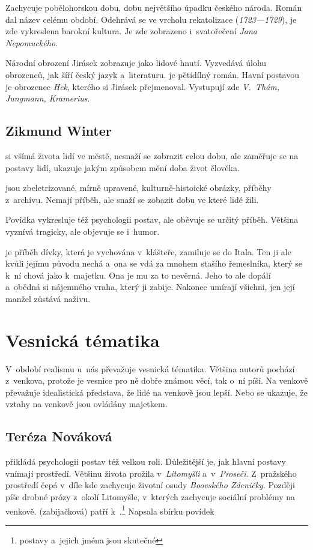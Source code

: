 Zachycuje pobělohorskou dobu, dobu největšího úpadku českého národa.
Román  dal název celému období. Odehrává se ve vrcholu
rekatolizace (\emph{1723---1729}), je zde vykreslena barokní kultura.
Je zde zobrazeno i~svatořečení \emph{Jana Nepomuckého}.

Národní obrození Jirásek zobrazuje jako lidové hnutí. Vyzvedává úlohu
obrozenců, jak šíří český jazyk a~literaturu.  je
pětidílný román. Havní postavou je obrozenec \emph{Hek}, kterého si Jirásek
přejmenoval. Vystupují zde \emph{V.~Thám, Jungmann, Kramerius}.

\subsection*{Zikmund Winter}
 si všímá života lidí ve městě, nesnaží se zobrazit celou
dobu, ale zaměřuje se na postavy lidí, ukazuje jakým způsobem mění doba
život člověka. 

 jsou zbeletrizované, mírně upravené,
kulturně-histoické obrázky, příběhy z~archívu. Nemají příběh,
ale snaží se zobazit dobu ve které lidé žili.

Povídka  vykresluje též psychologii postav,
ale oběvuje se určitý příběh. Většina vyznívá tragicky, ale
objevuje se i~humor.

 je příběh dívky, která je vychována v~klášteře,
zamiluje se do Itala. Ten ji ale kvůli jejímu původu nechá a~ona se vdá
za mnohem stašího řemeslníka, který se k~ní chová jako k~majetku. Ona je
mu za to nevěrná. Jeho to ale dopálí a~obědná si nájemného vraha, který
ji zabije. Nakonec umírají všichni, jen její manžel zůstává naživu.

\section{Vesnická tématika}
V~období realismu u~nás převažuje vesnická tématika. Většina autorů
pochází z~venkova, protože je vesnice pro ně dobře známou věcí, tak o~ní
píší. Na venkově převažuje idealistická představa, že lidé na venkově
jsou lepší. Nebo se ukazuje, že vztahy na venkově jsou ovládány majetkem.

\subsection*{Teréza Nováková}
 přikládá psychologii postav též velkou roli.
Důležitější je, jak hlavní postavy vnímají prostředí. Většinu života
prožila v~\emph{Litomyšli} a~v~\emph{Proseči}. Z~pražského prostředí
čepá v~díle  kde zachycuje životní osudy
\emph{Boovského Zdeničky}. Později píše drobné prózy z~okolí Litomyšle,
v~kterých zachycuje sociální problémy na venkově. 
(zabijačková) patří k~.\footnote{postavy
a~jejich jména jsou skutečné} Napsala sbírku povídek 


